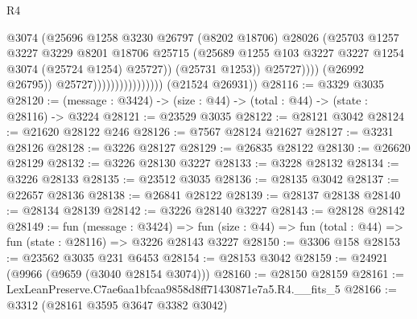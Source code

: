 \begin{lexlean}{R4}
\begin{coremodule}
                                                @3074
                                                (@25696
                                                  @1258
                                                  @3230
                                                  @26797
                                                  (@8202 @18706)
                                                  @28026
                                                  (@25703
                                                    @1257
                                                    @3227
                                                    @3229
                                                    @8201
                                                    @18706
                                                    @25715
                                                    (@25689
                                                      @1255
                                                      @103
                                                      @3227
                                                      @3227
                                                      @1254
                                                      @3074
                                                      (@25724 @1254)
                                                      @25727))
                                                  (@25731 @1253))
                                                @25727))))
                                        (@26992 @26795))
                                      @25727))))))))))))))))
      (@21524 @26931))
@28116 := @3329 @3035
@28120 := (message : @3424) -> (size : @44) -> (total : @44) -> (state : @28116) -> @3224
@28121 := @23529 @3035
@28122 := @28121 @3042
@28124 := @21620 @28122 @246
@28126 := @7567 @28124 @21627
@28127 := @3231 @28126
@28128 := @3226 @28127
@28129 := @26835 @28122
@28130 := @26620 @28129
@28132 := @3226 @28130 @3227
@28133 := @3228 @28132
@28134 := @3226 @28133
@28135 := @23512 @3035
@28136 := @28135 @3042
@28137 := @22657 @28136
@28138 := @26841 @28122
@28139 := @28137 @28138
@28140 := @28134 @28139
@28142 := @3226 @28140 @3227
@28143 := @28128 @28142
@28149 := fun (message : @3424) =>
  fun (size : @44) => fun (total : @44) => fun (state : @28116) => @3226 @28143 @3227
@28150 := @3306 @158
@28153 := @23562 @3035 @231 @6453
@28154 := @28153 @3042
@28159 := @24921 (@9966 (@9659 (@3040 @28154 @3074)))
@28160 := @28150 @28159
@28161 := LexLeanPreserve.C7ae6aa1bfcaa9858d8ff71430871e7a5.R4.__fits_5
@28166 := @3312 (@28161 @3595 @3647 @3382 @3042)

\end{coremodule}
\end{lexlean}
